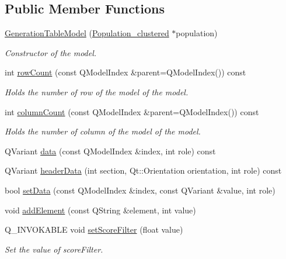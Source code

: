\subsection*{Public Member Functions}
\begin{DoxyCompactItemize}
\item 
\hyperlink{class_generation_table_model_a98fd1b28c293d4d92cf4fb9930598283}{Generation\+Table\+Model} (\hyperlink{class_population__clustered}{Population\+\_\+clustered} $\ast$population)
\begin{DoxyCompactList}\small\item\em Constructor of the model. \end{DoxyCompactList}\item 
int \hyperlink{class_generation_table_model_a7926bafcc1f8aee9c86d6f30011e7299}{row\+Count} (const Q\+Model\+Index \&parent=Q\+Model\+Index()) const
\begin{DoxyCompactList}\small\item\em Holds the number of row of the model of the model. \end{DoxyCompactList}\item 
int \hyperlink{class_generation_table_model_a0fe344e5bcfa0f832836f910e48de965}{column\+Count} (const Q\+Model\+Index \&parent=Q\+Model\+Index()) const
\begin{DoxyCompactList}\small\item\em Holds the number of column of the model of the model. \end{DoxyCompactList}\item 
Q\+Variant \hyperlink{class_generation_table_model_a7f391a05766aa4c3f696e54b04045b2e}{data} (const Q\+Model\+Index \&index, int role) const
\item 
Q\+Variant \hyperlink{class_generation_table_model_a82ba4ebad44e1b1bea80e9b00e63ce28}{header\+Data} (int section, Qt\+::\+Orientation orientation, int role) const
\item 
bool \hyperlink{class_generation_table_model_a8e66c46d9427fe327baecdbf107637f8}{set\+Data} (const Q\+Model\+Index \&index, const Q\+Variant \&value, int role)
\item 
void \hyperlink{class_generation_table_model_a2b7d4908fbe99194076d1a3aaa0c6e49}{add\+Element} (const Q\+String \&element, int value)
\item 
Q\+\_\+\+I\+N\+V\+O\+K\+A\+B\+LE void \hyperlink{class_generation_table_model_ad44d26706e15a73874f97308685195f3}{set\+Score\+Filter} (float value)
\begin{DoxyCompactList}\small\item\em Set the value of score\+Filter. \end{DoxyCompactList}\item 

\end{DoxyCompactItemize}
